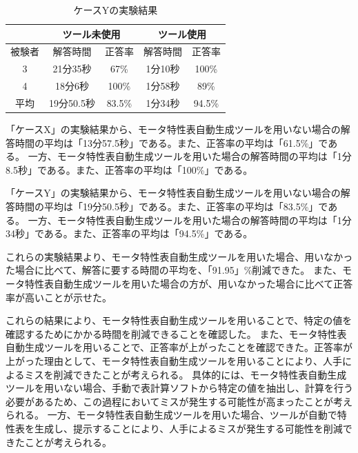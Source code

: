 \begin{table}[tp]
  \begin{center}
    \caption{ケースYの実験結果}
    \label{resultY}
    \begin{tabular}{c|c|c|c|c|}
    \cline{2-5}
                              & \multicolumn{2}{c|}{ツール未使用} & \multicolumn{2}{c|}{ツール使用} \\ \hline
    \multicolumn{1}{|c||}{被験者} & 解答時間           & 正答率          & 解答時間           & 正答率         \\ \hline\hline
    \multicolumn{1}{|c||}{3}   & 21分35秒           & 67\%         & 1分10秒           & 100\%         \\ \hline
    \multicolumn{1}{|c||}{4}   & 18分6秒          & 100\%          & 1分58秒          & 89\%         \\ \hline\hline
    \multicolumn{1}{|c||}{平均}   & 19分50.5秒          & 83.5\%          & 1分34秒          & 94.5\%         \\ \hline
    \end{tabular}
  \end{center}
\end{table}

「ケースX」の実験結果から、モータ特性表自動生成ツールを用いない場合の解答時間の平均は「13分57.5秒」である。また、正答率の平均は「61.5\%」である。
一方、モータ特性表自動生成ツールを用いた場合の解答時間の平均は「1分8.5秒」である。また、正答率の平均は「100\%」である。


「ケースY」の実験結果から、モータ特性表自動生成ツールを用いない場合の解答時間の平均は「19分50.5秒」である。また、正答率の平均は「83.5\%」である。
一方、モータ特性表自動生成ツールを用いた場合の解答時間の平均は「1分34秒」である。また、正答率の平均は「94.5\%」である。

これらの実験結果より、モータ特性表自動生成ツールを用いた場合、用いなかった場合に比べて、解答に要する時間の平均を、「91.95」\%削減できた。
また、モータ特性表自動生成ツールを用いた場合の方が、用いなかった場合に比べて正答率が高いことが示せた。

これらの結果により、モータ特性表自動生成ツールを用いることで、特定の値を確認するためにかかる時間を削減できることを確認した。
また、モータ特性表自動生成ツールを用いることで、正答率が上がったことを確認できた。正答率が上がった理由として、モータ特性表自動生成ツールを用いることにより、人手によるミスを削減できたことが考えられる。
具体的には、モータ特性表自動生成ツールを用いない場合、手動で表計算ソフトから特定の値を抽出し、計算を行う必要があるため、この過程においてミスが発生する可能性が高まったことが考えられる。
一方、モータ特性表自動生成ツールを用いた場合、ツールが自動で特性表を生成し、提示することにより、人手によるミスが発生する可能性を削減できたことが考えられる。

